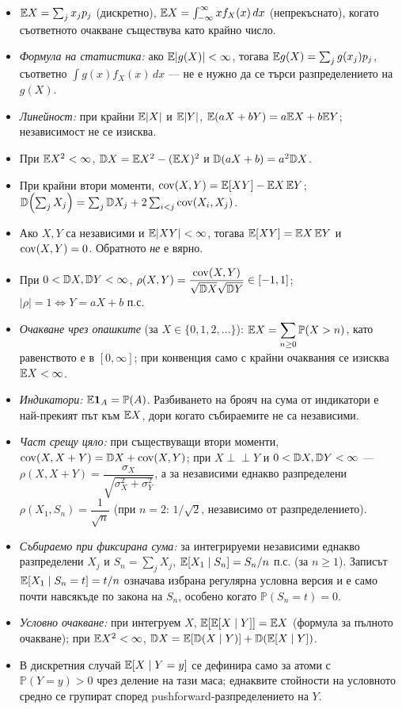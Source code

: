 \begin{itemize}\itemsep2pt
  \item $\mathbb{E} X = \sum_j x_j p_j$ (дискретно), $\mathbb{E} X = \int_{-\infty}^{\infty} x f_X(x)\,dx$ (непрекъснато),
        когато съответното очакване съществува като крайно число.
  \item \emph{Формула на статистика:} ако $\mathbb{E}|g(X)|<\infty$, тогава
        $\mathbb{E} g(X) = \sum_j g(x_j)p_j$, съответно $\int g(x) f_X(x)\,dx$
        — не е нужно да се търси разпределението на $g(X)$.
  \item \emph{Линейност:} при крайни $\mathbb{E}|X|$ и $\mathbb{E}|Y|$,
        $\mathbb{E}(aX+bY) = a\mathbb{E} X + b\mathbb{E} Y$; независимост не се изисква.
  \item При $\mathbb{E} X^2<\infty$, $\mathbb{D} X = \mathbb{E} X^2 - (\mathbb{E} X)^2$ и
        $\mathbb{D}(aX+b) = a^2 \mathbb{D} X$.
  \item При крайни втори моменти, $\operatorname{cov}(X,Y) = \mathbb{E}[XY] - \mathbb{E} X\,\mathbb{E} Y$;\quad
        $\mathbb{D}\!\left(\sum_j X_j\right) = \sum_j \mathbb{D} X_j + 2\sum_{i<j} \operatorname{cov}(X_i,X_j)$.
  \item Ако $X,Y$ са независими и $\mathbb{E}|XY|<\infty$, тогава
        $\mathbb{E}[XY] = \mathbb{E} X\,\mathbb{E} Y$ и $\operatorname{cov}(X,Y)=0$. Обратното \emph{не} е вярно.
  \item При $0<\mathbb{D} X,\mathbb{D} Y<\infty$,
        $\rho(X,Y) = \dfrac{\operatorname{cov}(X,Y)}{\sqrt{\mathbb{D} X}\sqrt{\mathbb{D} Y}} \in [-1,1]$;\quad
        $|\rho| = 1 \iff Y = aX+b$ п.с.
  \item \emph{Очакване чрез опашките} (за $X \in \{0,1,2,\dots\}$):
        $\displaystyle \mathbb{E} X = \sum_{n \ge 0} \mathbb{P}(X > n)$, като равенството
        е в $[0,\infty]$; при конвенция само с крайни очаквания се изисква $\mathbb{E} X<\infty$.
  \item \emph{Индикатори:} $\mathbb{E} \mathbf{1}_A = \mathbb{P}(A)$. Разбиването на брояч на сума от
        индикатори е най-прекият път към $\mathbb{E} X$, дори когато събираемите не са независими.
  \item \emph{Част срещу цяло:} при съществуващи втори моменти,
        $\operatorname{cov}(X, X+Y) = \mathbb{D} X + \operatorname{cov}(X,Y)$; при $X \perp\!\!\!\perp Y$ и
        $0<\mathbb{D} X,\mathbb{D} Y<\infty$ —
        $\rho(X, X+Y) = \dfrac{\sigma_X}{\sqrt{\sigma_X^2+\sigma_Y^2}}$, а за независими еднакво
        разпределени $\rho(X_1, S_n) = \dfrac{1}{\sqrt n}$ (при $n=2$: $1/\sqrt2$, независимо от
        разпределението).
  \item \emph{Събираемо при фиксирана сума:} за интегрируеми независими еднакво разпределени
        $X_j$ и $S_n=\sum_jX_j$, $\mathbb{E}[X_1\mid S_n]=S_n/n$ п.с. (за $n\ge1$).
        Записът $\mathbb{E}[X_1\mid S_n=t]=t/n$ означава избрана регулярна условна версия
        и е само почти навсякъде по закона на $S_n$, особено когато $\mathbb P(S_n=t)=0$.
  \item \emph{Условно очакване:} при интегруем $X$,
        $\mathbb{E}[\mathbb{E}[X \mid Y]] = \mathbb{E} X$ (формула за пълното очакване); при $\mathbb{E} X^2<\infty$,
        $\mathbb{D} X = \mathbb{E}[\mathbb{D}(X \mid Y)] + \mathbb{D}(\mathbb{E}[X \mid Y])$.
  \item В дискретния случай $\mathbb{E}[X\mid Y=y]$ се дефинира само за атоми
        с $\mathbb P(Y=y)>0$ чрез деление на тази маса; еднаквите стойности
        на условното средно се групират според pushforward-разпределението на $Y$.
\end{itemize}

